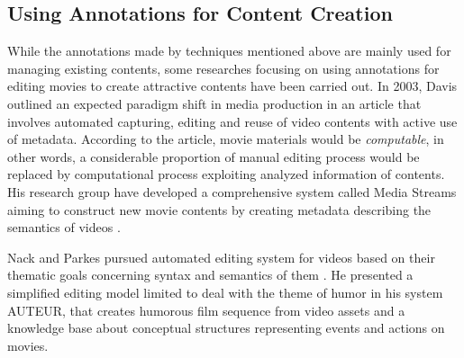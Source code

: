 \subsection{Using Annotations for Content Creation}
While the annotations made by techniques mentioned above are mainly used for managing existing contents, some researches focusing on using annotations for editing movies to create attractive contents have been carried out. %
In 2003, Davis outlined an expected paradigm shift in media production in an article \cite{davis2003editing} that involves automated capturing, editing and reuse of video contents with active use of metadata.
According to the article, movie materials would be {\it computable}, in other words, a considerable proportion of manual editing process would be replaced by computational process exploiting analyzed information of contents.
His research group have developed a comprehensive system called Media Streams aiming to construct new movie contents by creating metadata describing the semantics of videos \cite{davis2000media}.

Nack and Parkes pursued automated editing system for videos based on their thematic goals concerning syntax and semantics of them \cite{nack1997application}.
He presented a simplified editing model limited to deal with the theme of humor in his system AUTEUR, that creates humorous film sequence from video assets and a knowledge base about conceptual structures representing events and actions on movies.
